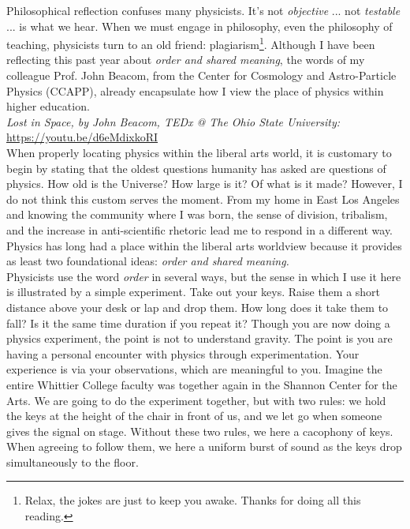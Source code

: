 \documentclass[../../../main.tex]{subfiles}
\begin{document}
Philosophical reflection confuses many physicists.  It's not \textit{objective} ... not \textit{testable} ... is what we hear.  When we must engage in philosophy, even the philosophy of teaching, physicists turn to an old friend: plagiarism\footnote{Relax, the jokes are just to keep you awake.  Thanks for doing all this reading.}.  Although I have been reflecting this past year about \textit{order and shared meaning}, the words of my colleague Prof. John Beacom, from the Center for Cosmology and Astro-Particle Physics (CCAPP), already encapsulate how I view the place of physics within higher education.
\\
\vspace{0.25cm}
\textit{Lost in Space, by John Beacom, TEDx @ The Ohio State University:} \url{https://youtu.be/d6eMdixkoRI}
\\
\vspace{0.25cm}
When properly locating physics within the liberal arts world, it is customary to begin by stating that the oldest questions humanity has asked are questions of physics.  How old is the Universe?  How large is it?  Of what is it made?  However, I do not think this custom serves the moment.  From my home in East Los Angeles and knowing the community where I was born, the sense of division, tribalism, and the increase in anti-scientific rhetoric lead me to respond in a different way.  Physics has long had a place within the liberal arts worldview because it provides as least two foundational ideas: \textit{order and shared meaning.}
\\
\vspace{0.25cm}
Physicists use the word \textit{order} in several ways, but the sense in which I use it here is illustrated by a simple experiment.  Take out your keys.  Raise them a short distance above your desk or lap and drop them.  How long does it take them to fall?  Is it the same time duration if you repeat it?  Though you are now doing a physics experiment, the point is not to understand gravity.  The point is you are having a personal encounter with physics through experimentation.  Your experience is via your observations, which are meaningful to you.  Imagine the entire Whittier College faculty was together again in the Shannon Center for the Arts.  We are going to do the experiment together, but with two rules: we hold the keys at the height of the chair in front of us, and we let go when someone gives the signal on stage.  Without these two rules, we here a cacophony of keys.  When agreeing to follow them, we here a uniform burst of sound as the keys drop simultaneously to the floor.
\end{document}
